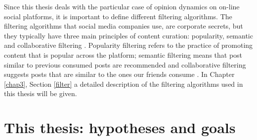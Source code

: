 \documentclass[11 pt , letterpaper , twoside , openright]{book}
\begin{document}
\newline
Since this thesis deals with the particular case of opinion dynamics on on-line social platforms, it is important to define different filtering algorithms. The filtering algorithms that social media companies use, are corporate secrets, but they typically have three main principles of content curation: popularity, semantic and collaborative filtering \cite{Perra2019}. Popularity filtering refers to the practice of promoting content that is popular across the platform; semantic filtering means that post similar to previous consumed posts are recommended and collaborative filtering suggests posts that are similar to the ones our friends consume \cite{Perra2019}. In Chapter \ref{chap3}, Section \ref{filter} a detailed description of the filtering algorithms used in this thesis will be given.

\section{This thesis: hypotheses and goals}\label{goal}
\end{document}
